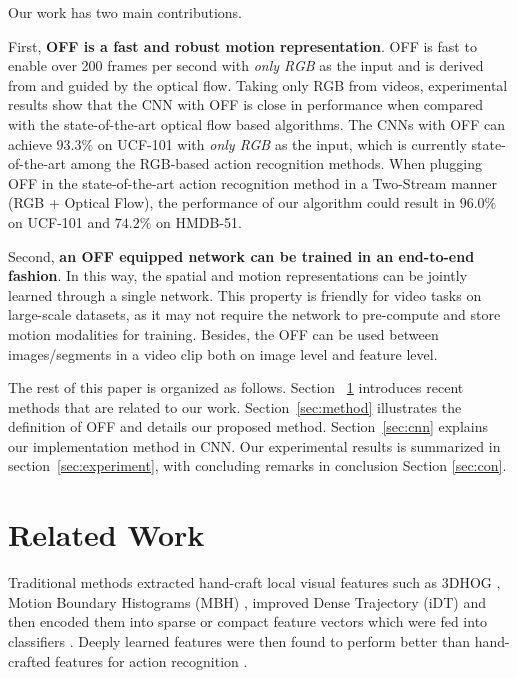 \documentclass[10pt,twocolumn,letterpaper]{article}
\begin{document}
Our work has two main contributions. 


First, \textbf{OFF is a fast and robust motion representation}. OFF is fast to enable over 200 frames per second with \textit{only RGB} as the input and is derived from and guided by the optical flow. Taking only RGB from videos, experimental results show that the CNN with OFF is close in performance when compared with the state-of-the-art optical flow based algorithms. The CNNs with OFF can achieve $93.3\%$ on UCF-101 with \textit{only RGB} as the input, which is currently state-of-the-art among the RGB-based action recognition methods. When plugging OFF in the state-of-the-art action recognition method \cite{wang2016tsn} in a Two-Stream manner (RGB + Optical Flow), the performance of our algorithm could result in $96.0\%$ on UCF-101 and $74.2\%$ on HMDB-51.



Second, \textbf{an OFF equipped network can be trained in an end-to-end fashion}. In this way, the spatial and motion representations can be jointly learned through a single network. This property is friendly for video tasks on large-scale datasets, as it may not require the network to pre-compute and store motion modalities for training. Besides, the OFF can be used between images/segments  in a video clip both on image level and feature level. 



The rest of this paper is organized as follows. Section ~\ref{sec:relate} introduces recent methods that are related to our work. Section~\ref{sec:method} illustrates the definition of OFF and details our proposed method. Section~\ref{sec:cnn} explains our implementation method in CNN. Our experimental results is summarized in section~\ref{sec:experiment}, with concluding remarks in conclusion Section \ref{sec:con}.













\section{Related Work}
\label{sec:relate}

Traditional methods extracted hand-craft local visual features such as 3DHOG \cite{Klaser2008}, Motion Boundary Histograms (MBH) \cite{Dalal2006}, improved Dense Trajectory (iDT) \cite{wang2013idt, wang2011idt} and then encoded them into sparse or compact feature vectors which were fed into classifiers \cite{Scovanner2007,Peng2014}. Deeply learned features were then found to perform better than hand-crafted features for action recognition \cite{simonyan2014two,wang2015tdd}.  
\end{document}
